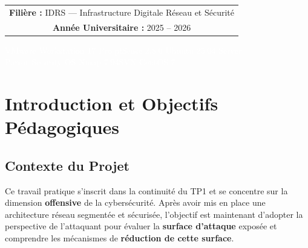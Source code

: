 \documentclass[12pt,a4paper,openany]{report}
\newif\ifshowpagenumbers
\newcommand{\hidepagenumbers}{\showpagenumbersfalse\pagestyle{empty}}
\newcommand{\showpagenumbers}{\showpagenumberstrue\pagestyle{fancy}}
\begin{document}
\begin{titlepage}
{\begin{tabular}{c}
				\textbf{\color{primary}Filière :} IDRS --- Infrastructure Digitale Réseau et Sécurité \\[0.3cm]
				\textbf{\color{primary}Année Universitaire :} 2025 -- 2026 \\
			\end{tabular}
		}
		
		\vfill
		
		\noindent
		\colorbox{primary}{%
			\parbox{\dimexpr\textwidth-2\fboxsep}{%
				\vspace{0.35cm}
				\centering
				{\small\textcolor{white}{%
						VMware Workstation 17 Pro
						\quad\textbullet\quad pfSense 2.8.0
						\quad\textbullet\quad Ubuntu 25.04 Server}}\\[0.2cm]
				{\small\textcolor{white}{%
						Parrot Security OS
						\quad\textbullet\quad Nmap 7.94SVN
						\quad\textbullet\quad CentOS 7}}\\[0.35cm]
			}%
		}%
	\end{titlepage}
	
	\hidepagenumbers
	
	\tableofcontents
	\newpage
	\listoffigures
	\listoftables
	\newpage
	
	\cleardoublepage
	\showpagenumbers
	\setcounter{page}{1}
	
	\chapter{Introduction et Objectifs Pédagogiques}
	
	\section{Contexte du Projet}
	Ce travail pratique s'inscrit dans la continuité du TP1 et se concentre sur la dimension \textbf{offensive} de la cybersécurité. Après avoir mis en place une architecture réseau segmentée et sécurisée, l'objectif est maintenant d'adopter la perspective de l'attaquant pour évaluer la \textbf{surface d'attaque} exposée et comprendre les mécanismes de \textbf{réduction de cette surface}.
	
\end{document}
